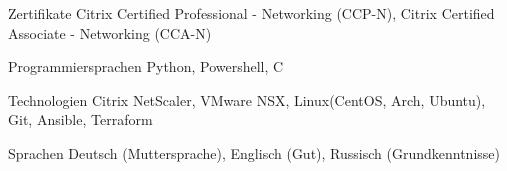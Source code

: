 


\begin{cvskills}


\cvskill
{Zertifikate}
{Citrix Certified Professional - Networking (CCP-N), Citrix Certified Associate - Networking (CCA-N)}

\cvskill
{Programmiersprachen} %
{Python, Powershell, C} %


\cvskill
{Technologien} %
{Citrix NetScaler, VMware NSX, Linux(CentOS, Arch, Ubuntu), Git, Ansible, Terraform} %



\cvskill
{Sprachen} %
{Deutsch (Muttersprache), Englisch (Gut), Russisch (Grundkenntnisse)} %


\end{cvskills}
